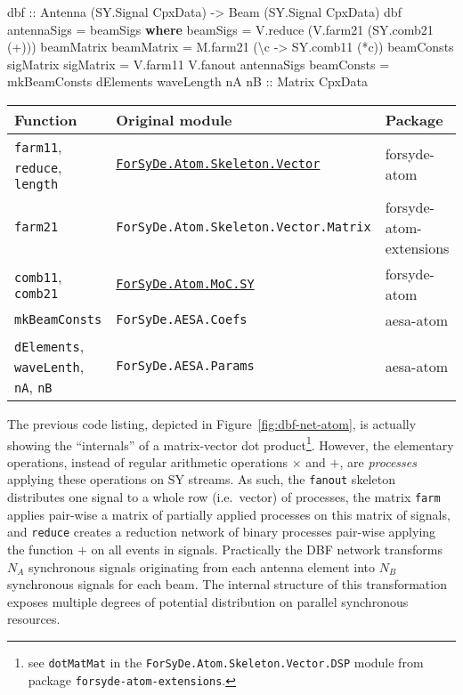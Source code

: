 \documentclass[
  a4paper,
]{article}
\newenvironment{Shaded}{}{}
\newcommand{\DataTypeTok}[1]{\textcolor[rgb]{0.56,0.13,0.00}{#1}}
\newcommand{\FunctionTok}[1]{\textcolor[rgb]{0.02,0.16,0.49}{#1}}
\newcommand{\KeywordTok}[1]{\textcolor[rgb]{0.00,0.44,0.13}{\textbf{#1}}}
\newcommand{\NormalTok}[1]{#1}
\newcommand{\OtherTok}[1]{\textcolor[rgb]{0.00,0.44,0.13}{#1}}
\begin{document}
\begin{Shaded}
\begin{Highlighting}[numbers=left,,firstnumber=157,]
\OtherTok{dbf ::} \DataTypeTok{Antenna}\NormalTok{ (}\DataTypeTok{SY.Signal} \DataTypeTok{CpxData}\NormalTok{)}
    \OtherTok{->} \DataTypeTok{Beam}\NormalTok{    (}\DataTypeTok{SY.Signal} \DataTypeTok{CpxData}\NormalTok{)}
\NormalTok{dbf antennaSigs }\FunctionTok{=}\NormalTok{ beamSigs}
  \KeywordTok{where}
\NormalTok{    beamSigs   }\FunctionTok{=}\NormalTok{ V.reduce (V.farm21 (SY.comb21 (}\FunctionTok{+}\NormalTok{))) beamMatrix}
\NormalTok{    beamMatrix }\FunctionTok{=}\NormalTok{ M.farm21 (\textbackslash{}c }\OtherTok{->}\NormalTok{ SY.comb11 (}\FunctionTok{*}\NormalTok{c)) beamConsts sigMatrix}
\NormalTok{    sigMatrix  }\FunctionTok{=}\NormalTok{ V.farm11 V.fanout antennaSigs}
\NormalTok{    beamConsts }\FunctionTok{=}\NormalTok{ mkBeamConsts dElements waveLength nA}\OtherTok{ nB ::} \DataTypeTok{Matrix} \DataTypeTok{CpxData}
\end{Highlighting}
\end{Shaded}

\begin{longtable}[]{@{}lll@{}}
\toprule
Function & Original module & Package\tabularnewline
\midrule
\endhead
\texttt{farm11}, \texttt{reduce}, \texttt{length} &
\href{https://forsyde.github.io/forsyde-atom/api/ForSyDe-Atom-Skeleton-Vector.html}{\texttt{ForSyDe.Atom.Skeleton.Vector}}
& forsyde-atom\tabularnewline
\texttt{farm21} & \texttt{ForSyDe.Atom.Skeleton.Vector.Matrix} &
forsyde-atom-extensions\tabularnewline
\texttt{comb11}, \texttt{comb21} &
\href{https://forsyde.github.io/forsyde-atom/api/ForSyDe-Atom-MoC-SY.html}{\texttt{ForSyDe.Atom.MoC.SY}}
& forsyde-atom\tabularnewline
\texttt{mkBeamConsts} & \texttt{ForSyDe.AESA.Coefs} &
aesa-atom\tabularnewline
\texttt{dElements}, \texttt{waveLenth}, \texttt{nA}, \texttt{nB} &
\texttt{ForSyDe.AESA.Params} & aesa-atom\tabularnewline
\bottomrule
\end{longtable}

\suppressfloats

The previous code listing, depicted in Figure~\ref{fig:dbf-net-atom}, is
actually showing the ``internals'' of a matrix-vector dot
product\footnote{see \texttt{dotMatMat} in the
  \texttt{ForSyDe.Atom.Skeleton.Vector.DSP} module from package
  \texttt{forsyde-atom-extensions}.}. However, the elementary
operations, instead of regular arithmetic operations \(\times\) and
\(+\), are \emph{processes} applying these operations on SY streams. As
such, the \texttt{fanout} skeleton distributes one signal to a whole row
(i.e.~vector) of processes, the matrix \texttt{farm} applies pair-wise a
matrix of partially applied processes on this matrix of signals, and
\texttt{reduce} creates a reduction network of binary processes
pair-wise applying the function \(+\) on all events in signals.
Practically the DBF network transforms \(N_A\) synchronous signals
originating from each antenna element into \(N_B\) synchronous signals
for each beam. The internal structure of this transformation exposes
multiple degrees of potential distribution on parallel synchronous
resources.
\end{document}
